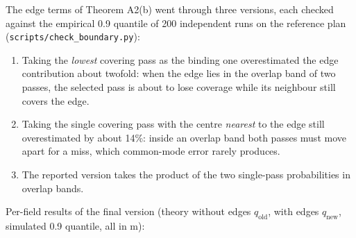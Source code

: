 \documentclass[preprint,12pt,authoryear]{elsarticle}
\providecommand{\tightlist}{\setlength{\itemsep}{0pt}\setlength{\parskip}{0pt}}
\begin{document}
The edge terms of Theorem A2(b) went through three versions, each checked against the empirical 0.9 quantile of 200 independent runs on the reference plan (\texttt{scripts/check\_boundary.py}):

\begin{enumerate}
\def\labelenumi{\arabic{enumi}.}
\tightlist
\item
  Taking the \emph{lowest} covering pass as the binding one overestimated the edge contribution about twofold: when the edge lies in the overlap band of two passes, the selected pass is about to lose coverage while its neighbour still covers the edge.
\item
  Taking the single covering pass with the centre \emph{nearest} to the edge still overestimated by about 14\%: inside an overlap band both passes must move apart for a miss, which common-mode error rarely produces.
\item
  The reported version takes the product of the two single-pass probabilities in overlap bands.
\end{enumerate}

Per-field results of the final version (theory without edges \(q_\mathrm{old}\), with edges \(q_\mathrm{new}\), simulated 0.9 quantile, all in m):
\end{document}
